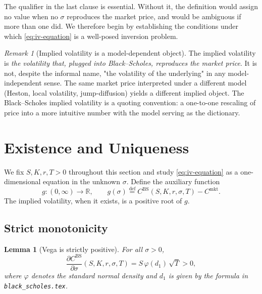 \documentclass[11pt,a4paper]{article}
\theoremstyle{plain}
\newtheorem{lemma}[theorem]{Lemma}
\theoremstyle{definition}
\theoremstyle{remark}
\newtheorem{remark}[theorem]{Remark}
\newcommand{\R}{\mathbb{R}}
\newcommand{\eqdef}{\overset{\mathrm{def}}{=}}
\newcommand{\BS}{\mathrm{BS}}
\begin{document}
The qualifier in the last clause is essential. Without it, the
definition would assign no value when no \(\sigma\) reproduces the
market price, and would be ambiguous if more than one did. We
therefore begin by establishing the conditions under which
\eqref{eq:iv-equation} is a well-posed inversion problem.

\begin{remark}[Implied volatility is a model-dependent object]
The implied volatility is \emph{the volatility that, plugged into
Black--Scholes, reproduces the market price}. It is not, despite the
informal name, "the volatility of the underlying" in any
model-independent sense. The same market price interpreted under a
different model (Heston, local volatility, jump-diffusion) yields a
different implied object. The Black--Scholes implied volatility is a
quoting convention: a one-to-one rescaling of price into a more
intuitive number with the model serving as the dictionary.
\end{remark}

\section{Existence and Uniqueness}

We fix \(S, K, r, T > 0\) throughout this section and study
\eqref{eq:iv-equation} as a one-dimensional equation in the unknown
\(\sigma\). Define the auxiliary function
\[
    g: (0, \infty) \to \R,
    \qquad
    g(\sigma) \eqdef C^{\BS}(S, K, r, \sigma, T) - C^{\mathrm{mkt}}.
\]
The implied volatility, when it exists, is a positive root of \(g\).

\subsection{Strict monotonicity}

\begin{lemma}[Vega is strictly positive]
\label{lem:vega-positive}
For all \(\sigma > 0\),
\[
    \frac{\partial C^{\BS}}{\partial \sigma}(S, K, r, \sigma, T)
    = S\,\varphi(d_1)\,\sqrt{T} > 0,
\]
where \(\varphi\) denotes the standard normal density and
\(d_1\) is given by the formula in \texttt{black\_scholes.tex}.
\end{lemma}
\end{document}

